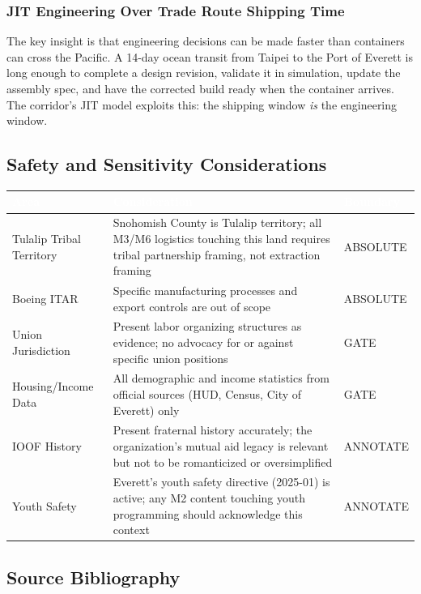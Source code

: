 \documentclass[11pt,letterpaper]{article}
\newcommand{\tableheader}[1]{\textbf{\sffamily\textcolor{white}{#1}}}
\begin{document}
\subsubsection{JIT Engineering Over Trade Route Shipping Time}

The key insight is that engineering decisions can be made faster than containers can cross the Pacific. A 14-day ocean transit from Taipei to the Port of Everett is long enough to complete a design revision, validate it in simulation, update the assembly spec, and have the corrected build ready when the container arrives. The corridor's JIT model exploits this: the shipping window \emph{is} the engineering window.

\subsection{Safety and Sensitivity Considerations}

\begin{center}
\begin{tabularx}{\textwidth}{L{3cm}XC{2.5cm}}
\toprule
{}
\tableheader{Area} & \tableheader{Consideration} & \tableheader{Boundary} \\
\midrule
Tulalip Tribal Territory & Snohomish County is Tulalip territory; all M3/M6 logistics touching this land requires tribal partnership framing, not extraction framing & ABSOLUTE \\
Boeing ITAR & Specific manufacturing processes and export controls are out of scope & ABSOLUTE \\
Union Jurisdiction & Present labor organizing structures as evidence; no advocacy for or against specific union positions & GATE \\
Housing/Income Data & All demographic and income statistics from official sources (HUD, Census, City of Everett) only & GATE \\
IOOF History & Present fraternal history accurately; the organization's mutual aid legacy is relevant but not to be romanticized or oversimplified & ANNOTATE \\
Youth Safety & Everett's youth safety directive (2025-01) is active; any M2 content touching youth programming should acknowledge this context & ANNOTATE \\
\bottomrule
\end{tabularx}
\end{center}

\subsection{Source Bibliography}
\end{document}
